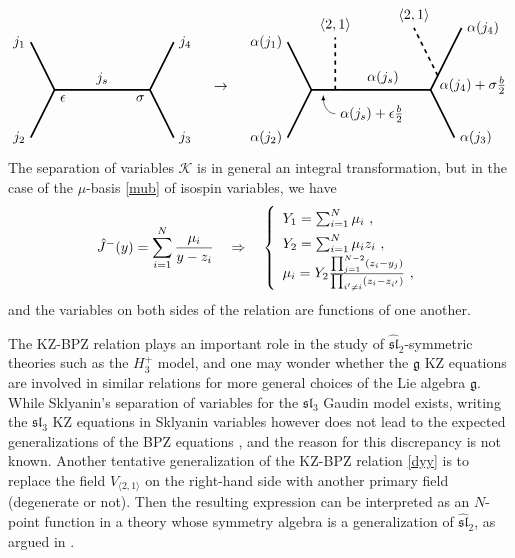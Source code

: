 \documentclass[12pt, a4paper, notitlepage, twoside]{report}
\numberwithin{equation}{section}
\theoremstyle{break}
\begin{document}
\begin{align}
\begin{tikzpicture}[baseline={(0,0)}, very thick, scale = .6]
\draw (-1,2) node [left] {$j_1$} -- (0,0) node[below right] {$\epsilon$} -- node [above] {$j_s$} (4,0) node[below left] {$\sigma$} -- (5,2) node [right] {$j_4$};
\draw (-1,-2) node [left] {$j_2$} -- (0,0);
\draw (4,0) -- (5,-2) node [right] {$j_3$};
\end{tikzpicture}
\quad \rightarrow \quad  
\begin{tikzpicture}[baseline={(0,0)}, very thick, scale = .6]
\draw (-1,2) node [left] {$\alpha(j_1)$} -- (0,0) -- (1,0) -- node [above] {$\alpha(j_s)$} (5,0) -- (6.3,2.6) node [right] {$\alpha(j_4)$};
\draw (-1,-2) node [left] {$\alpha(j_2)$} -- (0,0);
\draw (5,0) -- (6,-2) node [right] {$\alpha(j_3)$};
\draw[dashed] (1,0) -- (1,2.2) node[above] {$\left<2,1\right>$};
\draw[dashed] (5.3, .6) -- (4.3, 2.6) node[above] {$\left<2,1\right>$};
\node[right] at (5.15, .2) {$\alpha(j_4)+\sigma \frac{b}{2}$};
\draw[thin, latex-] (.5, -.2) to[out = -90, in = 180] (1,-1) node [right] {$\alpha(j_s) + \epsilon \frac{b}{2}$};
\end{tikzpicture}
\end{align}
The separation of variables $\mathcal{K}$ is in general an integral transformation, but in the case of the $\mu$-basis \eqref{mub} of isospin variables, we have 
\begin{align}
\renewcommand{\arraystretch}{1.5}
 \hat{J}^-(y) = \sum_{i=1}^N \frac{\mu_i}{y-z_i} \quad \Rightarrow \quad \left\{\begin{array}{l}  Y_1 =\sum_{i=1}^N \mu_i\ , \\ Y_2 = \sum_{i=1}^N \mu_i z_i\ , \\ \mu_i = Y_2\frac{\prod_{j=1}^{N-2}(z_i-y_j)}{\prod_{i'\neq i}(z_i-z_{i'})}\ ,\end{array}\right. 
\label{my}
\end{align}
and the variables on both sides of the relation are functions of one another. 

The KZ-BPZ relation plays an important role in the study of $\widehat{\mathfrak{sl}}_2$-symmetric theories such as the $H_3^+$ model, and one may wonder whether the $\mathfrak{g}$ KZ equations are involved in similar relations for more general choices of the Lie algebra $\mathfrak{g}$.
While Sklyanin's separation of variables for the $\mathfrak{sl}_3$ Gaudin model exists, writing the $\mathfrak{sl}_3$ KZ equations in Sklyanin variables however does not lead to the expected generalizations of the BPZ equations \cite{rib08b}, and the reason for this discrepancy is not known. 
Another tentative generalization of the KZ-BPZ relation \eqref{dyy} is to replace the field $V_{\langle 2,1\rangle}$ on the right-hand side with another primary field (degenerate or not).
Then the resulting expression can be interpreted as an $N$-point function in a theory whose symmetry algebra is a generalization of $\widehat{\mathfrak{sl}}_2$, as argued in \cite{rib08}.
\end{document}
